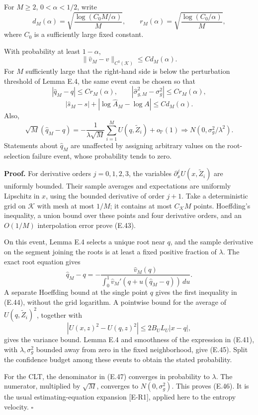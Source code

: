For \(M\ge2\), \(0<\alpha<1/2\), write \[
d_M(\alpha)=\sqrt{\frac{\log(C_0M/\alpha)}{M}},
\qquad
r_M(\alpha)=\sqrt{\frac{\log(C_0/\alpha)}{M}},
\tag{E.42}
\] where \(C_0\) is a sufficiently large fixed constant.

With probability at least \(1-\alpha\), \[
\|\widehat v_M-v\|_{C^3(\mathcal K)}
\le C d_M(\alpha).
\tag{E.43}
\] For \(M\) sufficiently large that the right-hand side is below the
perturbation threshold of Lemma E.4, the same event can be chosen so
that \[
|\widehat q_M-q|\le C r_M(\alpha),
\qquad
|\widehat\sigma_{g,M}^2-\sigma_g^2|\le C r_M(\alpha),
\tag{E.44}
\] \[
|\widehat s_M-s|+|\log\widehat A_M-\log A|
\le C d_M(\alpha).
\tag{E.45}
\] Also, \[
\sqrt M(\widehat q_M-q)
=-\frac1{\lambda\sqrt M}\sum_{i=1}^M U(q,\widetilde Z_i)
+o_{\mathbb P}(1)
\Rightarrow N(0,\sigma_g^2/\lambda^2).
\tag{E.46}
\] Statements about \(\widehat q_M\) are unaffected by assigning
arbitrary values on the root-selection failure event, whose probability
tends to zero.

\textbf{Proof.} For derivative orders \(j=0,1,2,3\), the variables
\(\partial_x^j U(x,\widetilde Z_i)\) are uniformly bounded. Their sample
averages and expectations are uniformly Lipschitz in \(x\), using the
bounded derivative of order \(j+1\). Take a deterministic grid on
\(\mathcal K\) with mesh at most \(1/M\); it contains at most
\(C_{\mathcal K}M\) points. Hoeffding's inequality, a union bound over
these points and four derivative orders, and an \(O(1/M)\) interpolation
error prove (E.43).

On this event, Lemma E.4 selects a unique root near \(q\), and the
sample derivative on the segment joining the roots is at least a fixed
positive fraction of \(\lambda\). The exact root equation gives \[
\widehat q_M-q
=-\frac{\widehat v_M(q)}
{\int_0^1\widehat v_M'(q+u(\widehat q_M-q))\,du}.
\tag{E.47}
\] A separate Hoeffding bound at the single point \(q\) gives the first
inequality in (E.44), without the grid logarithm. A pointwise bound for
the average of \(U(q,\widetilde Z_i)^2\), together with \[
|U(x,z)^2-U(q,z)^2|\le2B_UL_U|x-q|,
\] gives the variance bound. Lemma E.4 and smoothness of the expression
in (E.41), with \(\lambda,\sigma_g^2\) bounded away from zero in the
fixed neighborhood, give (E.45). Split the confidence budget among these
events to obtain the stated probability.

For the CLT, the denominator in (E.47) converges in probability to
\(\lambda\). The numerator, multiplied by \(\sqrt M\), converges to
\(N(0,\sigma_g^2)\). This proves (E.46). It is the usual
estimating-equation expansion {[}E-R1{]}, applied here to the entropy
velocity. \(\square\)

